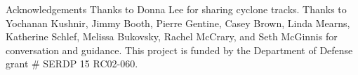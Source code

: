 \begin{block}{Acknowledgements}
    Thanks to Donna Lee for sharing cyclone tracks.
    Thanks to Yochanan Kushnir, Jimmy Booth, Pierre Gentine, Casey Brown, Linda Mearns, Katherine Schlef, Melissa Bukovsky, Rachel McCrary, and Seth McGinnis for conversation and guidance.
    This project is funded by the Department of Defense grant \# SERDP 15 RC02-060.
\end{block}
